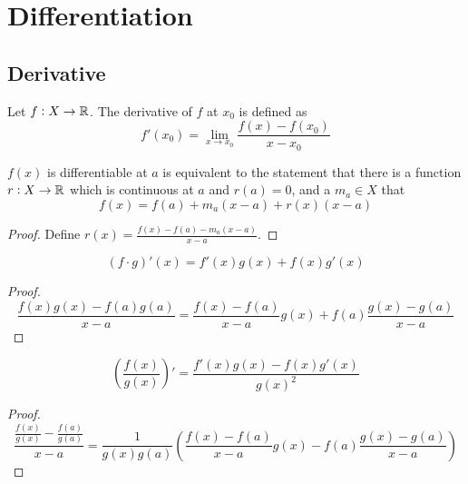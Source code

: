 \chapter{Differentiation}

\section{Derivative}

\begin{definition}
    Let $f: X \rightarrow \mathbb{R}$. The derivative of $f$ at $x_0$ is defined as
    \begin{equation}
        f'(x_0) = \lim_{x \rightarrow x_0} \frac{f(x) - f(x_0)}{x - x_0}
    \end{equation}
\end{definition}


\begin{theorem}
    $f(x)$ is differentiable at $a$ is equivalent to the statement that there is a function $r: X \rightarrow \mathbb{R}$ which is continuous at $a$ and $r(a)=0$, and a $m_a \in X$ that
    \begin{equation}
        f(x) = f(a) + m_a (x-a) + r(x)(x-a)
    \end{equation}
\end{theorem}
\begin{proof}
    Define $\displaystyle r(x) = \frac{f(x) - f(a) - m_a (x-a)}{x-a}$.
\end{proof}

\begin{theorem}
    \begin{equation}
        (f \cdot g)' (x) = f'(x) g(x) + f(x) g'(x)
    \end{equation}    
\end{theorem}
\begin{proof}
    \begin{equation}
        \frac{f(x)g(x) - f(a)g(a)}{x - a} = \frac{f(x) - f(a)}{x-a} g(x) + f(a) \frac{g(x) - g(a)}{x-a}
    \end{equation}
\end{proof}

\begin{theorem}
    \begin{equation}
        \left( \frac{f(x)}{g(x)} \right)' = \frac{f'(x)g(x) - f(x) g'(x)}{g(x)^2}
    \end{equation}    
\end{theorem}
\begin{proof}
    \begin{equation}
        \frac{\frac{f(x)}{g(x)} - \frac{f(a)}{g(a)}}{x - a} = \frac{1}{g(x) g(a)} \left( \frac{f(x) - f(a)}{x-a} g(x) - f(a) \frac{g(x) - g(a)}{x-a} \right)
    \end{equation}
\end{proof}

